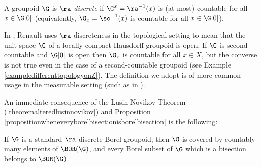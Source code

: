 
\begin{definition}[\cite{MR3142029,MR1799683}]
A groupoid $\G$ is \emph{$\ra$-discrete} if $\G^x=\ra^{-1}(x)$ is (at most) countable for all $x\in\G[0]$ (equivalently, $\G_x=\so^{-1}(x)$ is countable for all $x\in\G[0]$).
\end{definition}

\begin{remark}
In \cite[Definition 2.6]{MR584266}, Renault uses $\ra$-discreteness in the topological setting to mean that the unit space $\G$ of a locally compact Hausdorff groupoid is open. If $\G$ is second-countable and $\G[0]$ is open then $\G_x$ is countable for all $x\in X$, but the converse is not true even in the case of a second-countable groupoid (see Example \ref{exampledifferenttopologyonZ}). The definition we adopt is of more common usage in the measurable setting (such as in \cite{MR1799683}).
\end{remark}

An immediate consequence of the Lusin-Novikov Theorem (\ref{theoremalteredlusinnovikov}) and Proposition \ref{propositionwheneveryborelbisectionisborelbisection} is the following:

\begin{proposition}\label{radiscretestandardiscoveredbycountablymanyborg}
If $\G$ is a standard $\ra$-discrete Borel groupoid, then $\G$ is covered by countably many elements of $\BOR(\G)$, and every Borel subset of $\G$ which is a bisection belongs to $\BOR(\G)$.%
\end{proposition}
%


